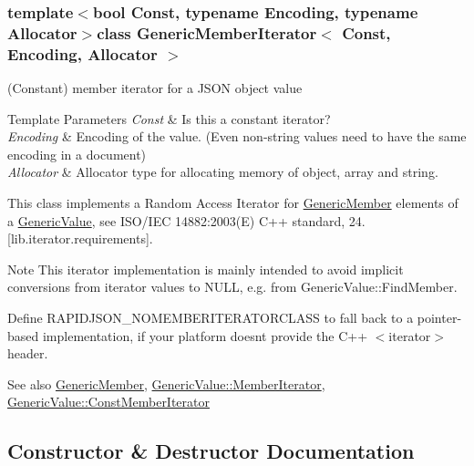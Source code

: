 \subsubsection*{template$<$bool Const, typename Encoding, typename Allocator$>$class Generic\+Member\+Iterator$<$ Const, Encoding, Allocator $>$}

(Constant) member iterator for a J\+S\+O\+N object value 


\begin{DoxyTemplParams}{Template Parameters}
{\em Const} & Is this a constant iterator? \\
\hline
{\em Encoding} & Encoding of the value. (Even non-\/string values need to have the same encoding in a document) \\
\hline
{\em Allocator} & Allocator type for allocating memory of object, array and string.\\
\hline
\end{DoxyTemplParams}
This class implements a Random Access Iterator for \hyperlink{struct_generic_member}{Generic\+Member} elements of a \hyperlink{class_generic_value}{Generic\+Value}, see I\+S\+O/\+I\+E\+C 14882\+:2003(E) C++ standard, 24. \mbox{[}lib.\+iterator.\+requirements\mbox{]}.

\begin{DoxyNote}{Note}
This iterator implementation is mainly intended to avoid implicit conversions from iterator values to {\ttfamily N\+U\+L\+L}, e.\+g. from Generic\+Value\+::\+Find\+Member.

Define {\ttfamily R\+A\+P\+I\+D\+J\+S\+O\+N\+\_\+\+N\+O\+M\+E\+M\+B\+E\+R\+I\+T\+E\+R\+A\+T\+O\+R\+C\+L\+A\+S\+S} to fall back to a pointer-\/based implementation, if your platform doesn\textquotesingle{}t provide the C++ $<$iterator$>$ header.
\end{DoxyNote}
\begin{DoxySeeAlso}{See also}
\hyperlink{struct_generic_member}{Generic\+Member}, \hyperlink{class_generic_value_a349b8faae61edc42b4289726820be439}{Generic\+Value\+::\+Member\+Iterator}, \hyperlink{class_generic_value_aac08c3e660a9036d3dcb8b10ff6c61f4}{Generic\+Value\+::\+Const\+Member\+Iterator} 
\end{DoxySeeAlso}


\subsection{Constructor \& Destructor Documentation}
\hypertarget{class_generic_member_iterator_a2708717d497a0aadacdf75900de4c5b4}{}
